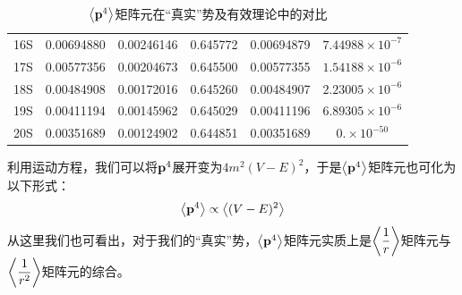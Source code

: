 \documentclass[cs4size,titlepage,twoside]{ctexart}
\begin{document}
\begin{table}[!tp]
\begin{tabular}{|cccccc|}
		16S                   & 0.00694880                         & 0.00246146                               & 0.645772                                 & 0.00694879                                                                   & $7.44988\times10^{-7}$   \\
		17S                   & 0.00577356                         & 0.00204673                               & 0.645500                                 & 0.00577355                                                                   & $1.54188\times10^{-6}$   \\
		18S                   & 0.00484908                         & 0.00172016                               & 0.645260                                 & 0.00484907                                                                   & $2.23005\times10^{-6}$   \\
		19S                   & 0.00411194                         & 0.00145962                               & 0.645029                                 & 0.00411196                                                                   & $6.89305\times10^{-6}$   \\
		20S                   & 0.00351689                         & 0.00124902                               & 0.644851                                 & 0.00351689                                                                   & $0.\times10^{-50}$       \\
		\hline
	\end{tabular}
	\caption{$\expval{\vb{p}^4}$矩阵元在“真实”势及有效理论中的对比}\label{p41}
\end{table}

利用运动方程，我们可以将$\vb{p}^4$展开变为$4m^2(V-E)^2$\cite{Lepage}，于是$\expval{\vb{p}^4}$矩阵元也可化为以下形式：
\begin{equation}
	\expval{\vb{p}^4}\propto\expval{(V-E)^2}
\end{equation}
从这里我们也可看出，对于我们的“真实”势，$\expval{\vb{p}^4}$矩阵元实质上是$\displaystyle\expval{\frac{1}{r}}$矩阵元与$\displaystyle\expval{\frac{1}{r^2}}$矩阵元的综合。
\end{document}
